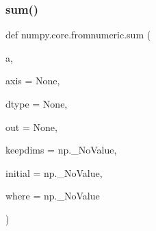 \subsubsection{\texorpdfstring{sum()}{sum()}}
{\footnotesize\ttfamily def numpy.\+core.\+fromnumeric.\+sum (\begin{DoxyParamCaption}\item[{}]{a,  }\item[{}]{axis = {\ttfamily None},  }\item[{}]{dtype = {\ttfamily None},  }\item[{}]{out = {\ttfamily None},  }\item[{}]{keepdims = {\ttfamily np.\+\_\+NoValue},  }\item[{}]{initial = {\ttfamily np.\+\_\+NoValue},  }\item[{}]{where = {\ttfamily np.\+\_\+NoValue} }\end{DoxyParamCaption})}

